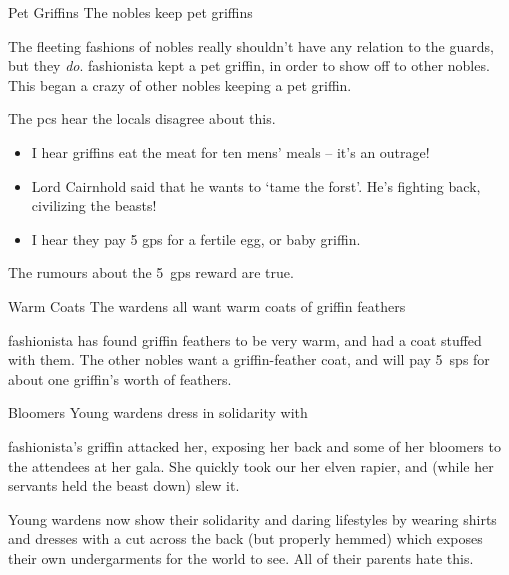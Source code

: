 
\ifcase\value{temperature}

  {Pet Griffins}%
  {The nobles keep pet griffins}%

  The fleeting fashions of nobles really shouldn't have any relation to the \glspl{guard}, but they \emph{do}.
  \Gls{fashionista} kept a pet griffin, in order to show off to other nobles.
  This began a crazy of other nobles keeping a pet griffin.

  The \glspl{pc} hear the locals disagree about this.

  \begin{itemize}
    \it
    \item
    I hear griffins eat the meat for ten mens' meals -- it's an outrage!
    \item
    Lord Cairnhold said that he wants to `tame the forst'.
    He's fighting back, civilizing the beasts!
    \item
    I hear they pay 5 \glspl{gp} for a fertile egg, or baby griffin.
  \end{itemize}

  The rumours about the 5~\glspl{gp} reward are true.

\or

  {Warm Coats}%
  {The wardens all want warm coats of griffin feathers}%

  \Gls{fashionista} has found griffin feathers to be very warm, and had a coat stuffed with them.
  The other nobles want a griffin-feather coat, and will pay 5~\glspl{sp} for about one griffin's worth of feathers.

\else

  {Bloomers}%
  {Young wardens dress in solidarity with }%

  \begin{exampletext}
    \Gls{fashionista}'s griffin attacked her, exposing her back and some of her bloomers to the attendees at her gala.
    She quickly took our her elven rapier, and (while her servants held the beast down) slew it.
  \end{exampletext}

  Young wardens now show their solidarity and daring lifestyles by wearing shirts and dresses with a cut across the back (but properly hemmed) which exposes their own undergarments for the world to see.
  All of their parents hate this.
\fi
